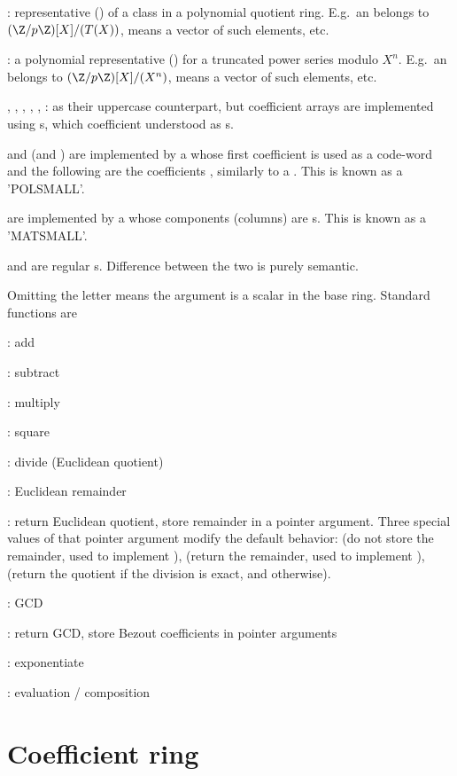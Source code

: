   : representative () of a class in a polynomial quotient ring.
  E.g.~an  belongs to $(\Z/p\Z)[X]/(T(X))$,  means a
  vector of such elements, etc.

  : a polynomial representative () for a truncated power
  series modulo $X^n$. E.g.~an  belongs to $(\Z/p\Z)[X]/(X^n)$,
   means a vector of such elements, etc.

  , , , , , : as their uppercase
  counterpart, but coefficient arrays are implemented using s,
  which coefficient understood as s.

   and  (and ) are implemented by a  whose
  first coefficient is used as a code-word and the following are the
  coefficients , similarly to a . This is known as a 'POLSMALL'.

   are implemented by a  whose components (columns) are
  s. This is known as a 'MATSMALL'.

   and  are regular s. Difference between the
  two is purely semantic.

\noindent Omitting the letter means the argument is a scalar in the base
ring. Standard functions  are

  : add

  : subtract

  : multiply

  : square

  : divide (Euclidean quotient)

  : Euclidean remainder

  : return Euclidean quotient, store remainder in a pointer
argument. Three special values of that pointer argument modify the default
behavior:  (do not store the remainder, used to implement
),  (return the remainder, used to implement
),  (return the quotient if the division is exact,
and  otherwise).

  : GCD

  : return GCD, store Bezout coefficients in pointer arguments

  : exponentiate

  : evaluation / composition

\section{Coefficient ring}

